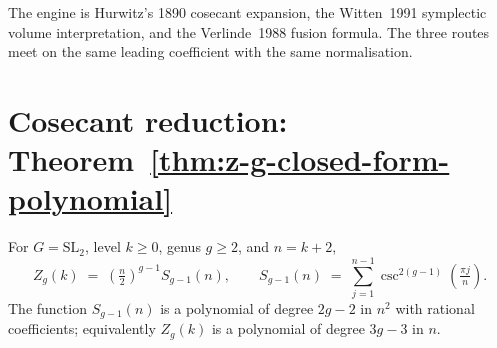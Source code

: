 The engine is Hurwitz's 1890 cosecant expansion, the Witten~1991 symplectic
volume interpretation, and the Verlinde~1988 fusion formula. The three
routes meet on the same leading coefficient with the same normalisation.

\section{Cosecant reduction: Theorem~\ref{thm:z-g-closed-form-polynomial}}

\begin{theorem}
\label{thm:z-g-closed-form-polynomial}
\ClaimStatusProvedHere
For $G = \mathrm{SL}_2$, level $k \ge 0$, genus $g \ge 2$, and $n = k+2$,
\begin{equation}
\label{eq:zg-csc}
Z_g(k) \;=\; \left(\tfrac{n}{2}\right)^{g-1} S_{g-1}(n), \qquad
S_{g-1}(n) \;=\; \sum_{j=1}^{n-1} \csc^{2(g-1)}\!\!\left(\tfrac{\pi j}{n}\right).
\end{equation}
The function $S_{g-1}(n)$ is a polynomial of degree $2g-2$ in $n^2$ with
rational coefficients; equivalently $Z_g(k)$ is a polynomial of degree
$3g-3$ in $n$.
\end{theorem}

